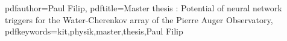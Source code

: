 \newcommand{\thesisentopic}{Potential of neural network triggers for the Water-Cherenkov array of the Pierre Auger Observatory}

\newcommand{\thesisinstitute}{Institute for Astroparticle Physics}

\newcommand{\thesisauthor}{Paul Filip}
\newcommand{\thesisreviewerone}{Prof. Dr. Ralph Engel}
\newcommand{\thesisreviewertwo}{Prof. Dr. Guido Drexlin}

\newcommand{\thesistimestart}{01.04.2022}
\newcommand{\thesistimeend}{02.05.2022}
\newcommand{\thesistimehandin}{02.05.2022}

\hypersetup
{
	pdfauthor={\thesisauthor},
	pdftitle={Master thesis : \thesisentopic},
	pdfkeywords={kit,physik,master,thesis,\thesisauthor}
}
